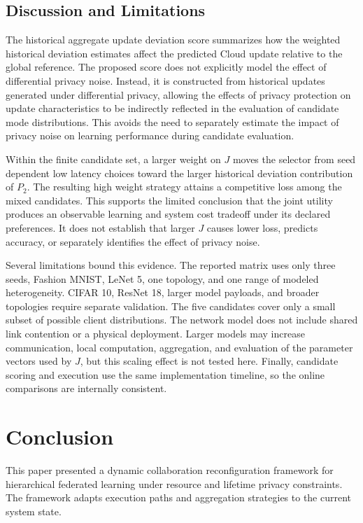 \documentclass[5p,times]{elsarticle}
\theoremstyle{plain}
\theoremstyle{definition}
\theoremstyle{remark}
\begin{document}
	\subsection{Discussion and Limitations}
	\label{sec:experiment_limits}
	
	
	The historical aggregate update deviation score
	summarizes how the weighted historical deviation
	estimates affect the predicted Cloud update
	relative to the global reference.
	The proposed score does not explicitly model
	the effect of differential privacy noise.
	Instead, it is constructed from historical
	updates generated under differential privacy,
	allowing the effects of privacy protection
	on update characteristics to be indirectly
	reflected in the evaluation of candidate
	mode distributions.
	This avoids the need to separately estimate
	the impact of privacy noise on learning
	performance during candidate evaluation.
	
	Within the finite candidate set, a larger weight on $J$ moves the selector from seed dependent low latency choices toward the larger historical deviation contribution of $P_2$. The resulting high weight strategy attains a competitive loss among the mixed candidates. This supports the limited conclusion that the joint utility produces an observable learning and system cost tradeoff under its declared preferences. It does not establish that larger $J$ causes lower loss, predicts accuracy, or separately identifies the effect of privacy noise.
	
	Several limitations bound this evidence. The reported matrix uses only three seeds, Fashion MNIST, LeNet 5, one topology, and one range of modeled heterogeneity. CIFAR 10, ResNet 18, larger model payloads, and broader topologies require separate validation. The five candidates cover only a small subset of possible client distributions. The network model does not include shared link contention or a physical deployment. Larger models may increase communication,
	local computation, aggregation, and evaluation of the parameter vectors used by $J$, but this scaling effect is not tested here. Finally, candidate scoring and execution use the same implementation timeline, so the online comparisons are internally consistent. 
	\FloatBarrier
	
	\section{Conclusion}
	\label{sec:conclusion}
	This paper presented a dynamic collaboration reconfiguration framework for hierarchical federated learning under resource and lifetime privacy constraints. The framework adapts execution paths and aggregation strategies to the current system state.
	
\end{document}
